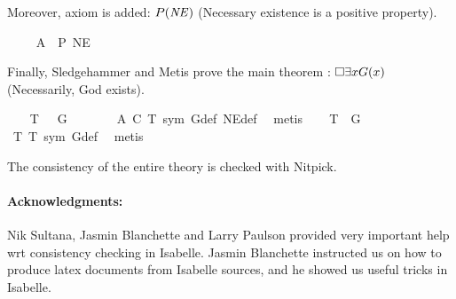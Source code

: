 \begin{isabellebody}
\begin{isamarkuptext}%
Moreover, axiom  is added: $P(\mathit{NE})$ (Necessary existence is a positive 
property).%
\end{isamarkuptext}%
\isamarkuptrue%
\ \ \isamarkupfalse%
\ \ A{}{\isacharcolon}\ \ {\isachardoublequoteopen}{\isacharbrackleft}P\ NE{\isacharbrackright}{\isachardoublequoteclose}%
\begin{isamarkuptext}%
Finally, Sledgehammer and Metis prove the main theorem : $\Box \exists x G(x)$ 
(Necessarily, God exists).%
\end{isamarkuptext}%
\isamarkuptrue%
\ \ \isamarkupfalse%
\ T{}{\isacharcolon}\ {\isachardoublequoteopen}{\isacharbrackleft}{\isasymbox}\ {\isacharparenleft}{\isasymexists}\ G{\isacharparenright}{\isacharbrackright}{\isachardoublequoteclose}\ \isanewline
\ \ \isanewline
%
\isadelimproof
\ \ %
\endisadelimproof
%
\isatagproof
{}\isamarkupfalse%
\ A{}\ C\ T{}\ sym\ G{\isacharunderscore}def\ NE{\isacharunderscore}def\ \isamarkupfalse%
\ metis%
\endisatagproof
{\isafoldproof}%
%
\isadelimproof
\isanewline
%
\endisadelimproof
\isanewline
\ \ \isamarkupfalse%
\ T{}{\isacharcolon}\ {\isachardoublequoteopen}{\isacharbrackleft}{\isasymexists}\ G{\isacharbrackright}{\isachardoublequoteclose}\ \isanewline
\ \ \isanewline
%
\isadelimproof
\ \ %
\endisadelimproof
%
\isatagproof
{}\isamarkupfalse%
\ T{}\ T{}\ sym\ G{\isacharunderscore}def\ \isamarkupfalse%
\ metis%
\endisatagproof
{\isafoldproof}%
%
\isadelimproof
%
\endisadelimproof
%
\begin{isamarkuptext}%
The consistency of the entire theory is checked with Nitpick.%
\end{isamarkuptext}%
\isamarkuptrue%
%
\begin{isamarkuptext}%
\paragraph{Acknowledgments:} Nik Sultana, Jasmin Blanchette and Larry Paulson provided 
very important help wrt consistency checking in Isabelle. Jasmin Blanchette instructed us on how to 
produce latex documents from Isabelle sources, and he showed us useful tricks in Isabelle.%
\end{isamarkuptext}%
\isamarkuptrue%
%
\isadelimtheory
%
\endisadelimtheory
%
\isatagtheory
%
\endisatagtheory
{\isafoldtheory}%
%
\isadelimtheory
%
\endisadelimtheory
\ \end{isabellebody}%
